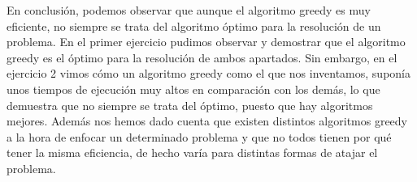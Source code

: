 En conclusión, podemos observar que aunque el algoritmo greedy es muy eficiente, no siempre se trata del algoritmo óptimo para la resolución de un problema. 
En el primer ejercicio pudimos observar y demostrar que el algoritmo greedy es el óptimo para la resolución de ambos apartados. Sin embargo, en el ejercicio 2
vimos cómo un algoritmo greedy como el que nos inventamos, suponía unos tiempos de ejecución muy altos en comparación con los demás, lo que demuestra que no siempre
se trata del óptimo, puesto que hay algoritmos mejores.
Además nos hemos dado cuenta que existen distintos algoritmos greedy a la hora de enfocar un determinado problema y que no todos tienen por qué tener la misma eficiencia,
de hecho varía para distintas formas de atajar el problema. 

